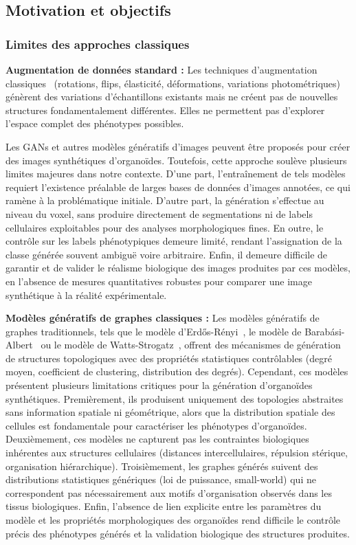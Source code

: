 \subsection{Motivation et objectifs}

\subsubsection{Limites des approches classiques}

\textbf{Augmentation de données standard :}
Les techniques d'augmentation classiques~\cite{Shorten2019} (rotations, flips, élasticité, déformations, variations photométriques) génèrent des variations d'échantillons existants mais ne créent pas de nouvelles structures fondamentalement différentes. Elles ne permettent pas d'explorer l'espace complet des phénotypes possibles.

Les GANs et autres modèles génératifs d'images peuvent être proposés pour créer des images synthétiques d'organoïdes. Toutefois, cette approche soulève plusieurs limites majeures dans notre contexte. D'une part, l'entraînement de tels modèles requiert l'existence préalable de larges bases de données d'images annotées, ce qui ramène à la problématique initiale. D'autre part, la génération s'effectue au niveau du voxel, sans produire directement de segmentations ni de labels cellulaires exploitables pour des analyses morphologiques fines. En outre, le contrôle sur les labels phénotypiques demeure limité, rendant l'assignation de la classe générée souvent ambiguë voire arbitraire. Enfin, il demeure difficile de garantir et de valider le réalisme biologique des images produites par ces modèles, en l'absence de mesures quantitatives robustes pour comparer une image synthétique à la réalité expérimentale.

\textbf{Modèles génératifs de graphes classiques :}
Les modèles génératifs de graphes traditionnels, tels que le modèle d'Erdős-Rényi~\cite{Erdos1959}, le modèle de Barabási-Albert~\cite{Barabasi1999} ou le modèle de Watts-Strogatz~\cite{Watts1998}, offrent des mécanismes de génération de structures topologiques avec des propriétés statistiques contrôlables (degré moyen, coefficient de clustering, distribution des degrés). Cependant, ces modèles présentent plusieurs limitations critiques pour la génération d'organoïdes synthétiques. Premièrement, ils produisent uniquement des topologies abstraites sans information spatiale ni géométrique, alors que la distribution spatiale des cellules est fondamentale pour caractériser les phénotypes d'organoïdes. Deuxièmement, ces modèles ne capturent pas les contraintes biologiques inhérentes aux structures cellulaires (distances intercellulaires, répulsion stérique, organisation hiérarchique). Troisièmement, les graphes générés suivent des distributions statistiques génériques (loi de puissance, small-world) qui ne correspondent pas nécessairement aux motifs d'organisation observés dans les tissus biologiques. Enfin, l'absence de lien explicite entre les paramètres du modèle et les propriétés morphologiques des organoïdes rend difficile le contrôle précis des phénotypes générés et la validation biologique des structures produites.


